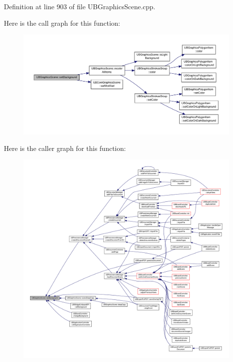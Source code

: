 Definition at line 903 of file U\-B\-Graphics\-Scene.\-cpp.



Here is the call graph for this function\-:
\nopagebreak
\begin{figure}[H]
\begin{center}
\leavevmode
\includegraphics[width=350pt]{dc/db2/class_u_b_graphics_scene_ad34fd16dd510a1a28cf2df3227a57a14_cgraph}
\end{center}
\end{figure}




Here is the caller graph for this function\-:
\nopagebreak
\begin{figure}[H]
\begin{center}
\leavevmode
\includegraphics[width=350pt]{dc/db2/class_u_b_graphics_scene_ad34fd16dd510a1a28cf2df3227a57a14_icgraph}
\end{center}
\end{figure}


